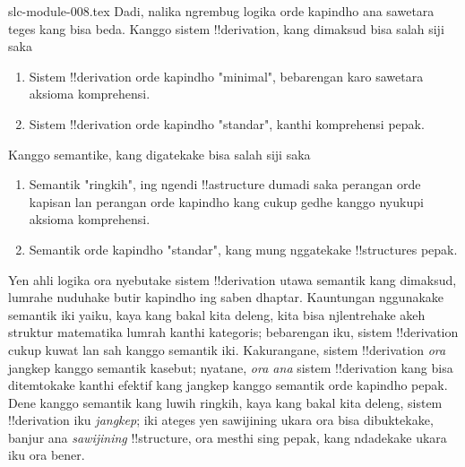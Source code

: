 \begin{filecontents*}[overwrite]{slc-module-008.tex}
Dadi, nalika ngrembug logika
orde kapindho ana sawetara
teges kang bisa beda. Kanggo
sistem !!{derivation}, kang
dimaksud bisa salah siji saka
\begin{enumerate}
\item Sistem !!{derivation}
  orde kapindho "minimal",
  bebarengan karo sawetara
  aksioma komprehensi.
\item Sistem !!{derivation}
  orde kapindho "standar",
  kanthi komprehensi pepak.
\end{enumerate}
Kanggo semantike, kang
digatekake bisa salah siji saka
\begin{enumerate}
\item Semantik "ringkih",
  ing ngendi !!a{structure}
  dumadi saka perangan orde
  kapisan lan perangan orde
  kapindho kang cukup gedhe
  kanggo nyukupi aksioma
  komprehensi.
\item Semantik orde kapindho
  "standar", kang mung
  nggatekake !!{structure}s pepak.
\end{enumerate}
Yen ahli logika ora nyebutake
sistem !!{derivation} utawa
semantik kang dimaksud,
lumrahe nuduhake butir kapindho
ing saben dhaptar. Kauntungan
nggunakake semantik iki yaiku,
kaya kang bakal kita deleng,
kita bisa njlentrehake akeh
struktur matematika lumrah
kanthi kategoris; bebarengan
iku, sistem !!{derivation}
cukup kuwat lan sah kanggo
semantik iki. Kakurangane,
sistem !!{derivation}
\emph{ora} jangkep kanggo
semantik kasebut; nyatane,
\emph{ora ana} sistem
!!{derivation} kang bisa
ditemtokake kanthi efektif
kang jangkep kanggo semantik
orde kapindho pepak. Dene
kanggo semantik kang luwih
ringkih, kaya kang bakal
kita deleng, sistem
!!{derivation} iku
\emph{jangkep}; iki ateges
yen sawijining ukara ora
bisa dibuktekake, banjur
ana \emph{sawijining}
!!{structure}, ora mesthi
sing pepak, kang ndadekake
ukara iku ora bener.


\end{filecontents*}
